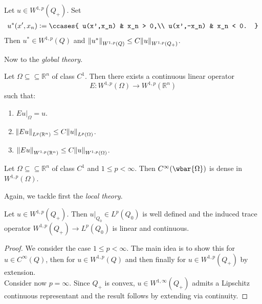 \begin{lemma}
	Let $u \in W^{1,p}(Q_+)$. Set
	\begin{align*}
		u^*(x',x_n) := \ccases{
			u(x',x_n) & x_n > 0,\\
			u(x',-x_n) & x_n < 0.
		}
	\end{align*}
	Then $u^* \in W^{1,p}(Q)$ and $\norm[0]{u^*}_{W^{1,p}(Q)} \leq C \norm{u}_{W^{1,p}(Q_+)}$.
\end{lemma}

Now to the \emph{global theory}.

\begin{theorem}[Extension]
	Let $\Omega \subseteq\subseteq \mathbb{R}^n$ of class $C^1$. Then there exists a continuous linear operator
	\begin{equation*}
		E : W^{1,p}(\Omega) \to W^{1,p}(\mathbb{R}^n)
	\end{equation*}
	\noindent such that:
	\begin{enumerate}[label = \textup{(}\roman*\textup{)},wide = 0pt]
		\item $Eu\vert_\Omega = u$.
		\item $\norm{Eu}_{L^p(\mathbb{R}^n)} \leq C \norm{u}_{L^p(\Omega)}$.
		\item $\norm[0]{Eu}_{W^{1,p}(\mathbb{R}^n)} \leq C\norm{u}_{W^{1,p}(\Omega)}$.
	\end{enumerate}
\end{theorem}

\begin{corollary}
	Let $\Omega \subseteq \subseteq \mathbb{R}^n$ of class $C^1$ and $1 \leq p < \infty$. Then $C^\infty(\wbar{\Omega})$ is dense in $W^{1,p}(\Omega)$.
\end{corollary}

Again, we tackle first the \emph{local theory}.

\begin{lemma}
	Let $u \in W^{1,p}(Q_+)$. Then $u\vert_{Q_0} \in L^p(Q_0)$ is well defined and the induced trace operator $W^{1,p}(Q_+) \to L^p(Q_0)$ is linear and continuous.
\end{lemma}

\begin{proof}
	We consider the case \underline{$1 \leq p < \infty$}. The main idea is to show this for $u \in C^\infty(Q)$, then for $u \in W^{1,p}(Q)$ and then finally for $u \in W^{1,p}(Q_+)$ by extension.\\
	Consider now \underline{$p = \infty$}. Since $Q_+$ is convex, $u \in W^{1,\infty}(Q_+)$ admits a Lipschitz continuous representant and the result follows by extending via continuity.
\end{proof}

